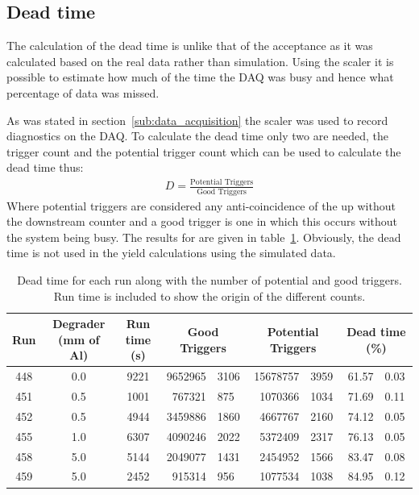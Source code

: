 \subsection{Dead time} %
\label{sub:dead_time}
The calculation of the dead time is unlike that of the acceptance as it was calculated based on the real data rather than simulation. Using the scaler it is possible to estimate how much of the time the DAQ was busy and hence what percentage of data was missed. 

As was stated in section~\ref{sub:data_acquisition} the scaler was used to record diagnostics on the DAQ. To calculate the dead time only two are needed, the trigger count and the potential trigger count which can be used to calculate the dead time thus:
\begin{align}
    D = \frac{\text{Potential Triggers}}{\text{Good Triggers}}
\end{align}
Where potential triggers are considered any anti-coincidence of the up without the downstream counter and a good trigger is one in which this occurs without the system being busy. The results for are given in table~\ref{tab:dead_time}. Obviously, the dead time is not used in the yield calculations using the simulated data.
\begin{table}
    \begin{center}
    \begin{tabular}{c|c|c|r@{ $\pm$ }l|r@{ $\pm$ }l|r@{ $\pm$ }l }
        Run & Degrader (mm of Al) & Run time (s) &
                              \multicolumn{2}{|c}{Good Triggers} &      
                              \multicolumn{2}{|c}{Potential Triggers} &
                              \multicolumn{2}{|c}{Dead time (\%)} \\
        \hline
        448 & 0.0 & 9221 & 9652965 & 3106 & 15678757 & 3959 & 61.57 & 0.03 \\
        451 & 0.5 & 1001 &  767321 & 875  &  1070366 & 1034 & 71.69 & 0.11 \\
        452 & 0.5 & 4944 & 3459886 & 1860 &  4667767 & 2160 & 74.12 & 0.05 \\
        455 & 1.0 & 6307 & 4090246 & 2022 &  5372409 & 2317 & 76.13 & 0.05 \\
        458 & 5.0 & 5144 & 2049077 & 1431 &  2454952 & 1566 & 83.47 & 0.08 \\
        459 & 5.0 & 2452 &  915314 & 956  &  1077534 & 1038 & 84.95 & 0.12 \\
    \end{tabular}
    \end{center}
    \caption{Dead time for each run along with the number of potential and good triggers. Run time is included to show the origin of the different counts.}
    \label{tab:dead_time}
\end{table}

